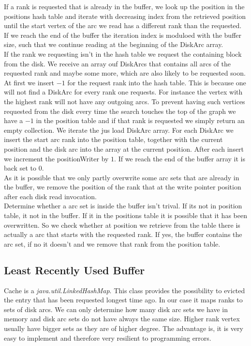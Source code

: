 If a rank is requested that is already in the buffer, we look up the position in the positions hash table and iterate with decreasing index from the retrieved position until the start vertex of the arc we read has a different rank than the requested. 
If we reach the end of the buffer the iteration index is moduloed with the buffer size, such that we continue reading at the beginning of the DiskArc array.
\\
If the rank we requesting isn't in the hash table we request the containing block from the disk. 
We receive an array ouf DiskArcs that contains all arcs of the requested rank and maybe some more, which are also likely to be requested soon. At first we insert $-1$ for the request rank into the hash table. 
This is because one will not find a DiskArc for every rank one requests.
For instance the vertex with the highest rank will not have any outgoing arcs. 
To prevent having such vertices requested from the disk every time the search touches the top of the graph we have a $-1$ in the position table and if that rank is requested we simply return an empty collection.
We iterate the jus load DiskArc array. For each DiskArc we insert the start arc rank into the position table, together with the current position and the disk arc into the array at the current position. After each insert 
we increment the positionWriter by $1$. If we reach the end of the buffer array it is back set to $0$. 
\\
As it is possible that we only partly overwrite some arc sets that are already in the buffer, we remove the position of the rank that at the write pointer position after each disk read invocation. 
\\ 
Determine whether a arc set is inside the buffer isn't trival. 
If its not in position table, it not in the buffer. 
If it in the positions table it is possible that it has been overwritten. 
So we check whether at position we retrieve from the table there is actually a arc that starts with the requested rank.
If yes, the buffer contains the arc set, if no it doesn't and we remove that rank from the position table. 


\subsection{Least Recently Used Buffer}

Cache is a \textit{java.util.LinkedHashMap}. This class provides the possibility to evicted the entry that has been requested longest time ago. In our case it maps ranks to sets of disk arcs. We can only determine how many 
disk arc sets we have in memory and disk arc sets do not have always the same size. Higher rank vertex usually have bigger sets as they are of higher degree. The advantage is, it is very easy to implement and therefore very 
resilient to programming errors.


